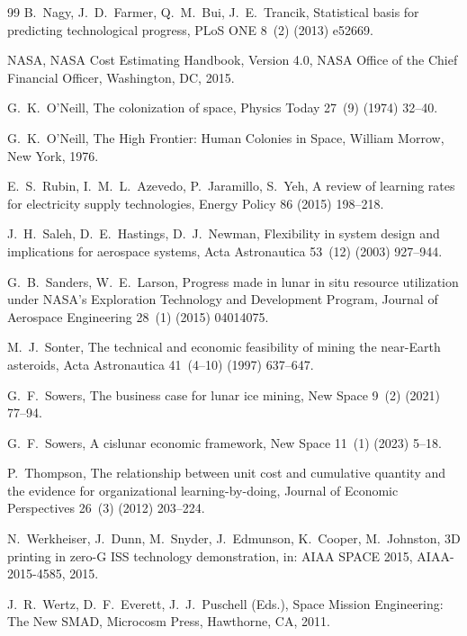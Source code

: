 \documentclass[5p,twocolumn]{elsarticle}
\begin{document}
\begin{thebibliography}{99}
B.~Nagy, J.~D.~Farmer, Q.~M.~Bui, J.~E.~Trancik,
\newblock Statistical basis for predicting technological progress,
\newblock PLoS ONE 8~(2) (2013) e52669.

NASA,
\newblock NASA Cost Estimating Handbook, Version 4.0,
\newblock NASA Office of the Chief Financial Officer, Washington, DC, 2015.

G.~K.~O'Neill,
\newblock The colonization of space,
\newblock Physics Today 27~(9) (1974) 32--40.

G.~K.~O'Neill,
\newblock The High Frontier: Human Colonies in Space,
\newblock William Morrow, New York, 1976.

E.~S.~Rubin, I.~M.~L.~Azevedo, P.~Jaramillo, S.~Yeh,
\newblock A review of learning rates for electricity supply technologies,
\newblock Energy Policy 86 (2015) 198--218.

J.~H.~Saleh, D.~E.~Hastings, D.~J.~Newman,
\newblock Flexibility in system design and implications for aerospace systems,
\newblock Acta Astronautica 53~(12) (2003) 927--944.

G.~B.~Sanders, W.~E.~Larson,
\newblock Progress made in lunar in situ resource utilization under NASA's Exploration Technology and Development Program,
\newblock Journal of Aerospace Engineering 28~(1) (2015) 04014075.

M.~J.~Sonter,
\newblock The technical and economic feasibility of mining the near-Earth asteroids,
\newblock Acta Astronautica 41~(4--10) (1997) 637--647.

G.~F.~Sowers,
\newblock The business case for lunar ice mining,
\newblock New Space 9~(2) (2021) 77--94.

G.~F.~Sowers,
\newblock A cislunar economic framework,
\newblock New Space 11~(1) (2023) 5--18.

P.~Thompson,
\newblock The relationship between unit cost and cumulative quantity and the evidence for organizational learning-by-doing,
\newblock Journal of Economic Perspectives 26~(3) (2012) 203--224.

N.~Werkheiser, J.~Dunn, M.~Snyder, J.~Edmunson, K.~Cooper, M.~Johnston,
\newblock 3D printing in zero-G ISS technology demonstration,
\newblock in: AIAA SPACE 2015, AIAA-2015-4585, 2015.

J.~R.~Wertz, D.~F.~Everett, J.~J.~Puschell (Eds.),
\newblock Space Mission Engineering: The New SMAD,
\newblock Microcosm Press, Hawthorne, CA, 2011.


\end{thebibliography}
\end{document}
